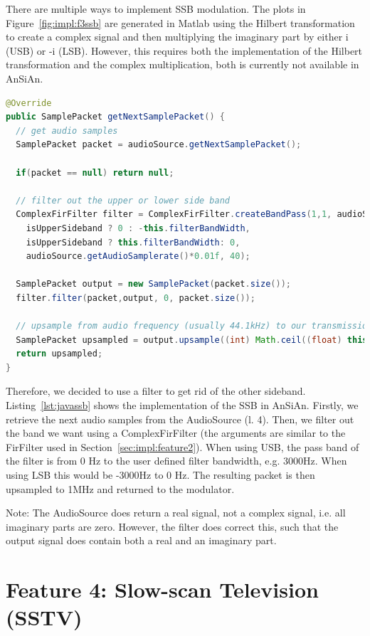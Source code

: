 There are multiple ways to implement SSB modulation. The plots in Figure~\ref{fig:impl:f3ssb} are generated in Matlab using the Hilbert transformation to create a complex signal and then multiplying the imaginary part by either i (USB) or -i (LSB). However, this requires both the implementation of the Hilbert transformation and the complex multiplication, both is currently not available in AnSiAn. 

\begin{lstlisting}[label=lst:javassb, caption=Modulating microphone samples using SSB, language=java,]
@Override
public SamplePacket getNextSamplePacket() {
  // get audio samples
  SamplePacket packet = audioSource.getNextSamplePacket();
	
  if(packet == null) return null;
	
  // filter out the upper or lower side band
  ComplexFirFilter filter = ComplexFirFilter.createBandPass(1,1, audioSource.getAudioSamplerate(),
	isUpperSideband ? 0 : -this.filterBandWidth,
	isUpperSideband ? this.filterBandWidth: 0,
	audioSource.getAudioSamplerate()*0.01f, 40);
	
  SamplePacket output = new SamplePacket(packet.size());
  filter.filter(packet,output, 0, packet.size());
	
  // upsample from audio frequency (usually 44.1kHz) to our transmission frequency (1MHz)
  SamplePacket upsampled = output.upsample((int) Math.ceil((float) this.sampleRate / audioSource.getAudioSamplerate()));
  return upsampled;
}
\end{lstlisting}


Therefore, we decided to use a filter to get rid of the other sideband. Listing~\ref{lst:javassb} shows the implementation of the SSB in AnSiAn. Firstly, we retrieve the next audio samples from the AudioSource (l. 4). Then, we filter out the band we want using a ComplexFirFilter (the arguments are similar to the FirFilter used in Section~\ref{sec:impl:feature2}). When using USB, the pass band of the filter is from 0 Hz to the user defined filter bandwidth, e.g. 3000Hz. When using LSB this would be -3000Hz to 0 Hz. The resulting packet is then upsampled to 1MHz and returned to the modulator. 

Note: The AudioSource does return a real signal, not a complex signal, i.e. all imaginary parts are zero. However, the filter does correct this, such that the output signal does contain both a real and an imaginary part.

\section{Feature 4: Slow-scan Television (SSTV)}

